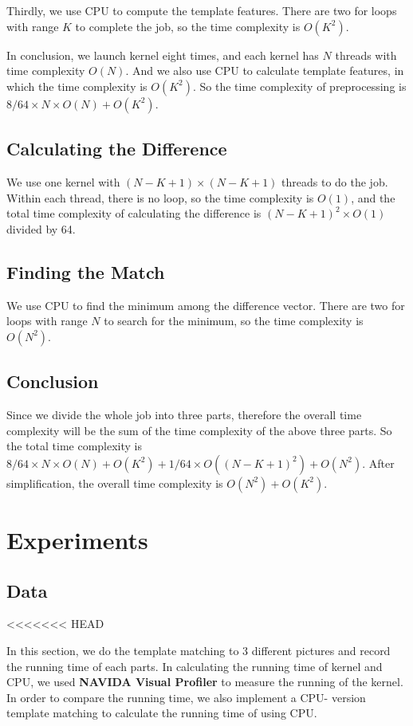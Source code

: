\documentclass[12pt, a4paper]{article}
\begin{document}
    Thirdly, we use CPU to compute the template features. There are two for loops
    with range $K$ to complete the job, so the time complexity is $O(K^2)$.

    In conclusion, we launch kernel eight times, and each kernel has $N$ threads with
    time complexity $O(N)$. And we also use CPU to calculate template features, in which
    the time complexity is $O(K^2)$. So the time complexity of preprocessing is
    $8/64 \times N \times O(N) + O(K^2)$.
  \subsection{Calculating the Difference}
    We use one kernel with $(N - K + 1) \times (N - K + 1)$ threads to do the job.
    Within each thread, there is no loop, so the time complexity is $O(1)$, and the
    total time complexity of calculating the difference is $(N - K + 1) ^ 2 \times O(1)$ divided by 64.
  \subsection{Finding the Match}
    We use CPU to find the minimum among the difference vector. There are two for
    loops with range $N$ to search for the minimum, so the time complexity is $O(N ^ 2)$.
  \subsection{Conclusion}
    Since we divide the whole job into three parts, therefore the overall time complexity
    will be the sum of the time complexity of the above three parts. So the total
    time complexity is $8/64 \times N \times O(N) + O(K^2) + 1/64 \times O((N - K + 1) ^ 2) + O(N ^ 2)$.
    After simplification, the overall time complexity is $O(N ^ 2) + O(K ^ 2)$.


\section{Experiments}
  \subsection{Data}
<<<<<<< HEAD

In this section, we do the template matching to 3 different pictures and record the running time of each 
parts. In calculating the running time of kernel and CPU, we used \textbf{NAVIDA Visual Profiler} to
measure the running of the kernel. In order to compare the running time, we also implement a CPU-
version template matching to calculate the running time of using CPU.
\end{document}
